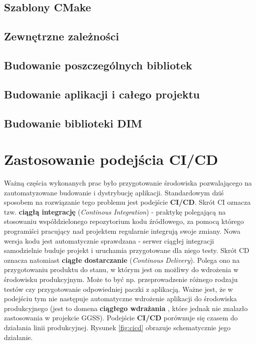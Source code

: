 \subsection{Szablony CMake}

\subsection{Zewnętrzne zależności}

\subsection{Budowanie poszczególnych bibliotek}

\subsection{Budowanie aplikacji i całego projektu} 

\subsection{Budowanie biblioteki DIM}



\newpage
\section{Zastosowanie podejścia CI/CD}
Ważną częścia wykonanych prac było przygotowanie środowiska pozwalającego na zautomatyzowane budowanie i dystrybucję aplikacji. Standardowym dziś sposobem na rozwiązanie tego problemu jest podejście \textbf{CI/CD}. Skrót CI oznacza tzw. \textbf{ciągłą integrację} (\textit{Continous Integration}) - praktykę polegającą na stosowaniu współdzielonego repozytorium kodu źródłowego, za pomocą którego programiści pracujący nad projektem regularnie integrują swoje zmiany. Nowa wersja kodu jest automatycznie sprawdzana - serwer ciągłej integracji samodzielnie buduje projekt i uruchamia przygotowane dla niego testy. Skrót CD oznacza natomiast \textbf{ciągłe dostarczanie} (\textit{Continous Delivery}). Polega ono na przygotowaniu produktu do stanu, w którym jest on możliwy do wdrożenia w środowisku produkcyjnym. Może to być np. przeprowadzenie różnego rodzaju testów czy przygotowanie odpowiedniej paczki z aplikacją. Ważne jest, że w podejściu tym nie następuje automatyczne wdrożenie aplikacji do środowiska produkcyjnego (jest to domena \textbf{ciągłego wdrażania} \cite{CICDDef}, które jednak nie znalazło zastosowania w projekcie GGSS). Podejście \textbf{CI/CD} porównuje się czasem do działania linii produkcyjnej. Rysunek \ref{fig:cicd} obrazuje schematycznie jego działanie. 

